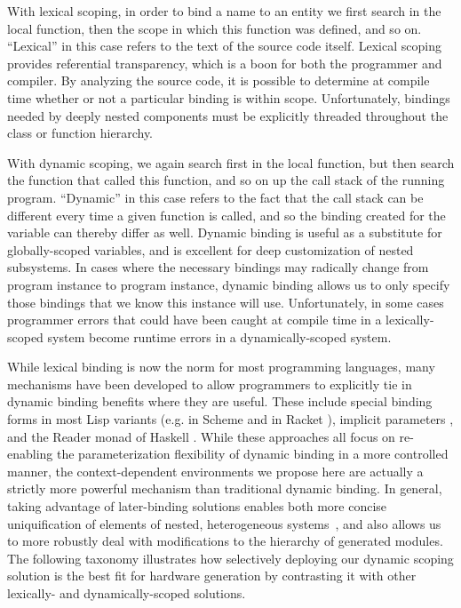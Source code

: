With lexical scoping, in order to bind a name to an entity we first search in the local function, then the scope in which this function was defined, and so on.
``Lexical'' in this case refers to the text of the source code itself.
Lexical scoping provides referential transparency, which is a boon for both the programmer and compiler.
By analyzing the source code, it is possible to determine at compile time whether or not a particular binding is within scope.
Unfortunately, bindings needed by deeply nested components must be explicitly threaded throughout the class or function hierarchy.

With dynamic scoping, we again search first in the local function, but then search the function that called this function, and so on up the call stack of the running program.
``Dynamic'' in this case refers to the fact that the call stack can be different every time a given function is called, and so the binding created for the variable can thereby differ as well.
Dynamic binding is useful as a substitute for globally-scoped variables, and is excellent for deep customization of nested subsystems.
In cases where the necessary bindings may radically change from program instance to program instance, dynamic binding allows us to only specify those bindings that we know this instance will use.
Unfortunately, in some cases programmer errors that could have been caught at compile time in a lexically-scoped system become runtime errors in a dynamically-scoped system.

While lexical binding is now the norm for most programming languages, many mechanisms have been developed to allow programmers to explicitly tie in dynamic binding benefits where they are useful.
These include special binding forms in most Lisp variants
(e.g.  in Scheme \cite{steele} and  in Racket \cite{flatt2013racket}),
implicit parameters \cite{lewis2000implicit}, and the Reader monad of Haskell \cite{jones1995functional}.
While these approaches all focus on re-enabling the parameterization flexibility of dynamic binding in a more controlled manner, 
the context-dependent environments we propose here are actually a strictly more powerful mechanism than traditional dynamic binding. 
In general, taking advantage of later-binding solutions enables both more concise uniquification of elements of nested, heterogeneous systems~\cite{shacham2011chip},
and also allows us to more robustly deal with modifications to the hierarchy of generated modules.
The following taxonomy illustrates how selectively deploying our dynamic scoping solution is the best fit for hardware generation
by contrasting it with other lexically- and dynamically-scoped solutions.

